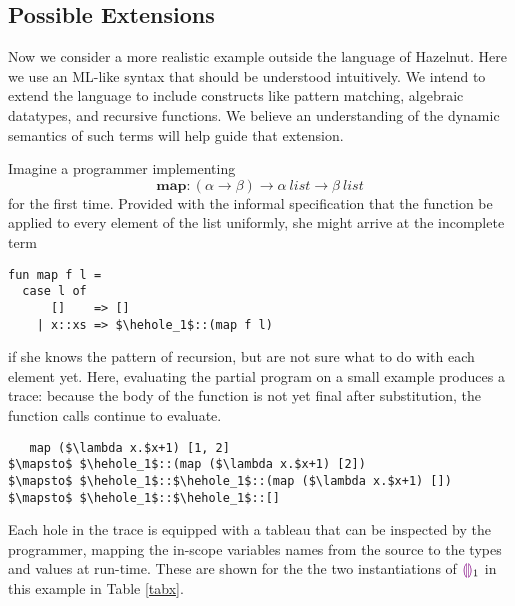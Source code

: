 \subsection{Possible Extensions}
Now we consider a more realistic example outside the language of
Hazelnut. Here we use an ML-like syntax that should be understood
intuitively. We intend to extend the language to include constructs like
pattern matching, algebraic datatypes, and recursive functions. We believe
an understanding of the dynamic semantics of such terms will help guide
that extension.

Imagine a programmer implementing $$\mathbf{map} : (\alpha \to \beta) \to
\alpha ~\mathit{list} \to \beta ~\mathit{list}$$ for the first time.
Provided with the informal specification that the function be applied to
every element of the list uniformly, she might arrive at the incomplete
term
\begin{lstlisting}
fun map f l =
  case l of
      []    => []
    | x::xs => $\hehole_1$::(map f l)
\end{lstlisting}
if she knows the pattern of recursion, but are not sure what to do with
each element yet. Here, evaluating the partial program on a small example
produces a trace: because the body of the function is not yet final after
substitution, the function calls continue to evaluate.
\begin{lstlisting}
   map ($\lambda x.$x+1) [1, 2]
$\mapsto$ $\hehole_1$::(map ($\lambda x.$x+1) [2])
$\mapsto$ $\hehole_1$::$\hehole_1$::(map ($\lambda x.$x+1) [])
$\mapsto$ $\hehole_1$::$\hehole_1$::[]
\end{lstlisting}
Each hole in the trace is equipped with a tableau that can be inspected by
the programmer, mapping the in-scope variables names from the source to the
types and values at run-time. These are shown for the the two
instantiations of $\textcolor{violet}{\llparenthesis}\textcolor{violet}{\rrparenthesis}_1$ in this example in Table \ref{tabx}.
